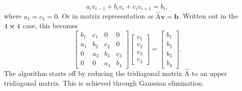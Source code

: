 \documentclass[a4paper,10pt,]{article}
\begin{document}
\begin{equation}
a_i v_{i-1} + b_i v_i +c_i v_{i+1} = b_i,
\end{equation}
where $a_1 = c_1 = 0$. Or in matrix representation as $\hat{\text{A}} \mathbf{v} = \mathbf{b}$. Written out in the $4 \cross 4$ case, this becomes
\begin{equation}
\begin{bmatrix}
b_1 & c_1 & 0 & 0 \\
a_1& b_2 & c_2 & 0 \\
0 & a_3 & b_3 & c_3 \\
0 & 0 & a_4 & b_4 
\end{bmatrix}
\begin{bmatrix}
v_1 \\
v_2 \\
v_3 \\
v_4
\end{bmatrix}
=
\begin{bmatrix}
b_1\\
b_2\\
b_3\\
b_4
\end{bmatrix}.
\end{equation}
The algorithm starts off by reducing the tridiagonal matrix $\hat{\text{A}}$ to an upper tridiagonal matrix. This is achieved through Gaussian elimination.
\end{document}
